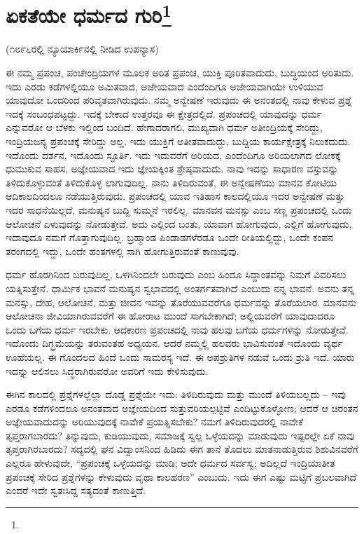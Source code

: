 
\chapter[ಏಕತೆಯೇ ಧರ್ಮದ ಗುರಿ]{ಏಕತೆಯೇ ಧರ್ಮದ ಗುರಿ\protect\footnote{}}

\begin{center}
(೧೮೯೬ರಲ್ಲಿ ನ್ಯೂಯಾರ್ಕಿನಲ್ಲಿ ನೀಡಿದ ಉಪನ್ಯಾಸ)
\end{center}

ಈ ನಮ್ಮ ಪ್ರಪಂಚ, ಪಂಚೇಂದ್ರಿಯಗಳ ಮೂಲಕ ಅರಿತ ಪ್ರಪಂಚ, ಯುಕ್ತಿ ಪೂರಿತವಾದುದು, ಬುದ್ಧಿಯಿಂದ ಅರಿತುದು. ಇದು ಎರಡು ಕಡೆಗಳಲ್ಲಿಯೂ ಅಮಿತವಾದ, ಅಜೇಯವಾದ ಎಂದೆಂದಿಗೂ ಅಜೇಯವಾಗಿಯೇ ಉಳಿಯುವ ಯಾವುದೋ ಒಂದರಿಂದ ಪರಿವೃತವಾಗಿರುವುದು. ನಮ್ಮ ಅನ್ವೇಷಣೆ ಇರುವುದು ಈ ಅನಂತದಲ್ಲಿ ನಾವು ಕೇಳುವ ಪ್ರಶ್ನೆ ಇದಕ್ಕೆ ಸಂಬಂಧಪಟ್ಟದ್ದು. ಇದಕ್ಕೆ ಬೇಕಾದ ಉತ್ತರವೂ ಈ ಕ್ಷೇತ್ರದಲ್ಲಿದೆ. ಪ್ರಪಂಚದಲ್ಲಿ ಯಾವುದನ್ನು ಧರ್ಮ ಎನ್ನುವರೋ ಆ ಬೆಳಕು ಇಲ್ಲಿಂದ ಬಂದಿದೆ. ಹೇಗಾದರಾಗಲಿ, ಮುಖ್ಯವಾಗಿ ಧರ್ಮ ಅತೀಂದ್ರಿಯಕ್ಕೆ ಸೇರಿದ್ದು, ಇಂದ್ರಿಯಜನ್ಯ ಪ್ರಪಂಚಕ್ಕೆ ಸೇರಿದ್ದು ಅಲ್ಲ. ಇದು ಯುಕ್ತಿಗೆ ಅತೀತವಾದುದ್ದು, ಬುದ್ದಿಯ ಕಾರ್ಯಕ್ಷೇತ್ರಕ್ಕೆ ನಿಲುಕದುದು. ಇದೊಂದು ದರ್ಶನ, ಇದೊಂದು ಸ್ಫೂರ್ತಿ. ಇದು ಇದುವರೆಗೆ ಅರಿಯದ, ಎಂದೆಂದಿಗೂ ಅರಿಯಲಾಗದ ಲೋಕಕ್ಕೆ ಧುಮುಕುವ ಸಾಹಸ, ಅಜ್ಞೇಯವಾದ ಇದು ಜ್ಞೇಯಕ್ಕಿಂತ ಶ್ರೇಷ್ಠವಾದುದು. ನಾವು ಇದನ್ನು ಸಾಧಾರಣ ವಸ್ತುವನ್ನು ತಿಳಿದುಕೊಳ್ಳುವಂತೆ ತಿಳಿದುಕೊಳ್ಳ ಲಾಗುವುದಿಲ್ಲ. ನಾನು ತಿಳಿದಿರುವಂತೆ, ಈ ಅನ್ವೇಷಣೆಯು ಮಾನವ ಕೋಟಿಯ ಆದಿಕಾಲದಿಂದಲೂ ನಡೆಯುತ್ತಿರುವುದು. ಪ್ರಪಂಚದಲ್ಲಿ ಯಾವ ಇತಿಹಾಸ ಕಾಲದಲ್ಲಿಯೂ ಇದರ ಅನ್ವೇಷಣೆ ಮತ್ತು ಇದರ ಸಾಧನೆಯಿಲ್ಲದೆ, ಮನುಷ್ಯನ ಬುದ್ದಿ ಸುಮ್ಮನೆ ಇರಲಿಲ್ಲ. ಮಾನವನ ಮನಸ್ಸು ಎಂಬ ಸಣ್ಣ ಪ್ರಪಂಚದಲ್ಲಿ ಒಂದು ಆಲೋಚನೆ ಏಳುವುದನ್ನು ನೋಡುತ್ತೇವೆ. ಅದು ಎಲ್ಲಿಂದ ಬಂತು, ಯಾವಾಗ ಹೋಗುವುದು, ಎಲ್ಲಿಗೆ ಹೋಗುವುದು, ಇದಾವುದೂ ನಮಗೆ ಗೊತ್ತಾಗುವುದಿಲ್ಲ. ಬ್ರಹ್ಮಾಂಡ ಪಿಂಡಾಡಗಳೆರಡೂ ಒಂದೇ ರೀತಿಯಲ್ಲಿದ್ದು, ಒಂದೇ ಕಂಪನ ತರಂಗದಲ್ಲಿ ಇದ್ದು, ಒಂದೇ ಹಂತಗಳಲ್ಲಿ ಸಾಗಿ ಹೋಗುತ್ತಿರುವಂತೆ ಕಾಣುವುವು.

ಧರ್ಮ ಹೊರಗಿನಿಂದ ಬರುವುದಿಲ್ಲ, ಒಳಗಿನಿಂದಲೇ ಬರುವುದು ಎಂಬ ಹಿಂದೂ ಸಿದ್ದಾಂತವನ್ನು ನಿಮಗೆ ವಿವರಿಸಲು ಯತ್ನಿಸುತ್ತೇನೆ. ಧಾರ್ಮಿಕ ಭಾವನೆ ಮನುಷ್ಯನ ಸ್ವಭಾವದಲ್ಲಿ ಅಂತರ್ಗತವಾಗಿದೆ ಎಂಬುದು ನನ್ನ ಭಾವನೆ. ಅವನು ತನ್ನ ಮನಸ್ಸು, ದೇಹ, ಆಲೋಚನೆ, ಮತ್ತು ಜೀವನ ಇವನ್ನು ತೊರೆಯುವವರೆಗೂ ಧರ್ಮವನ್ನು ತೊರೆಯಲಾರ. ಮಾನವನು ಆಲೋಚನಾ ಜೀವಿಯಾಗಿರುವವರೆಗೆ ಈ ಹೋರಾಟ ಮುಂದೆ ಸಾಗಬೇಕಾಗಿದೆ; ಅಲ್ಲಿಯವರೆಗೆ ಯಾವುದಾದರೂ ಒಂದು ಬಗೆಯ ಧರ್ಮ ಇರಬೇಕು. ಆದಕಾರಣ ಪ್ರಪಂಚದಲ್ಲಿ ನಾವು ಹಲವು ಬಗೆಯ ಧರ್ಮಗಳನ್ನು ನೋಡುತ್ತೇವೆ. ಇದೊಂದು ದಿಗ್ಭ್ರಮೆಯನ್ನು ತರುವಂತಹ ಅಧ್ಯಯನ. ಆದರೆ ನಮ್ಮಲ್ಲಿ ಹಲವರು ಭಾವಿಸುವಂತೆ ಇದೊಂದು ವ್ಯರ್ಥ ಊಹೆಯಲ್ಲ. ಈ ಗೊಂದಲದ ಹಿಂದೆ ಒಂದು ಸಾಮರಸ್ಯ ಇದೆ. ಈ ಅಪಶ್ರುತಿಗಳ ನಡುವೆ ಒಂದು ಶ್ರುತಿ ಇದೆ. ಯಾರು ಇದನ್ನು ಆಲಿಸಲು ಸಿದ್ಧರಾಗಿರುವರೋ ಅವರಿಗೆ ಇದು ಕೇಳಿಸುವುದು.

ಈಗಿನ ಕಾಲದಲ್ಲಿ ಪ್ರಶ್ನೆಗಳಲ್ಲೆಲ್ಲಾ ದೊಡ್ಡ ಪ್ರಶ್ನೆಯೇ ಇದು: ತಿಳಿದಿರುವುದು ಮತ್ತು ಮುಂದೆ ತಿಳಿಯಬಲ್ಲದು – ಇವು ಎರಡೂ ಕಡೆಗಳಿಂದಲೂ ಅನಂತವಾದ ಅಜ್ಞೇಯದಿಂದ ಸುತ್ತುವರಿಯಲ್ಪಟ್ಟಿವೆ ಎಂದಿಟ್ಟುಕೊಳ್ಳೋಣ; ಆದರೆ ಆ ಚಿರಂತನ ಅಜ್ಞೇಯವಾದುದನ್ನು ಅರಿಯುವುದಕ್ಕೆ ನಾವೇಕೆ ಪ್ರಯತ್ನಿಸಬೇಕು? ನಮಗೆ ತಿಳಿದಿರುವುದರಲ್ಲಿ ನಾವೇಕೆ ತೃಪ್ತರಾಗಬಾರದು? ತಿನ್ನುವುದು, ಕುಡಿಯುವುದು, ಸಮಾಜಕ್ಕೆ ಸ್ವಲ್ಪ ಒಳ್ಳೆಯದನ್ನು ಮಾಡುವುದು ಇಷ್ಟರಲ್ಲೇ ಏಕೆ ನಾವು ತೃಪ್ತರಾಗಿರಬಾರದು? ಸದ್ಯದಲ್ಲಿ ಘನ ವಿದ್ವಾಂಸನಿಂದ ಹಿಡಿದು ಈಗ ತಾನೆ ತೊದಲು ಮಾತನಾಡುತ್ತಿರುವ ಶಿಶುವಿನವರೆಗೆ ಎಲ್ಲರೂ ಹೇಳುವುದೇ, “ಪ್ರಪಂಚಕ್ಕೆ ಒಳ್ಳೆಯದನ್ನು ಮಾಡಿ; ಅದೇ ಧರ್ಮದ ಸರ್ವಸ್ವ; ಅದಿಲ್ಲದೆ ಇಂದ್ರಿಯಾತೀತ ಪ್ರಪಂಚಕ್ಕೆ ಸೇರಿದ ಪ್ರಶ್ನೆಗಳನ್ನು ಕೇಳುವುದು ವೃಥಾ ಕಾಲಹರಣ'' ಎಂಬುದು. ಇದು ಈಗ ಎಷ್ಟು ಮಟ್ಟಿಗೆ ಪ್ರಬಲವಾಗಿದೆ ಎಂದರೆ ಇದೇ ಸ್ವತಃಸಿದ್ದ ಸತ್ಯದಂತೆ ಕಾಣುತ್ತಿದೆ.

